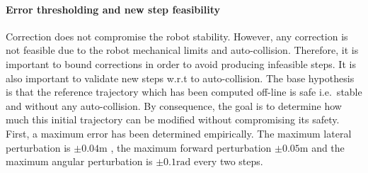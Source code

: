 \paragraph{Error thresholding and new step feasibility}
%
%
Correction does not compromise the robot stability. However, any
correction is not feasible due to the robot mechanical limits and
auto-collision. Therefore, it is important to bound corrections in
order to avoid producing infeasible steps. It is also important to
validate new steps w.r.t to auto-collision.
%
%
The base hypothesis is that the reference trajectory which has been
computed off-line is safe i.e.\ stable and without any
auto-collision. By consequence, the goal is to determine how much this
initial trajectory can be modified without compromising its safety.
%
First, a maximum error has been determined empirically. The maximum
lateral perturbation is $\pm 0.04 \mathrm{m}$ , the maximum forward
perturbation $\pm 0.05 \mathrm{m}$ and the maximum angular
perturbation is $\pm 0.1 \mathrm{rad}$ every two steps.
%
